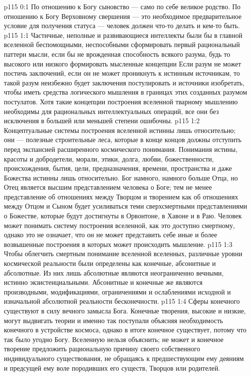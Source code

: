 \author{Могучий Вестник}
\vs p115 0:1 По отношению к Богу сыновство --- само по себе великое родство. По отношению к Богу Верховному свершения --- это необходимое предварительное условие для получения статуса --- человек должен что\hyp{}то делать и кем\hyp{}то быть.
\vs p115 1:1 Частичные, неполные и развивающиеся интеллекты были бы в главной вселенной беспомощными, неспособными сформировать первый рациональный паттерн мысли, если бы не врожденная способность всякого разума, будь то высокого или низкого формировать мысленные концепции  Если разум не может постичь заключений, если он не может проникнуть к истинным источникам, то такой разум неизбежно будет заключения постулировать и источники изобретать, чтобы иметь средства логического мышления в границах этих созданных разумом постулатов. Хотя такие концепции построения вселенной тварному мышлению необходимы для рациональных интеллектуальных операций, все они без исключения в большей или меньшей степени ошибочны.
\vs p115 1:2 Концептуальные системы построения вселенной истинны лишь относительно; они --- полезные строительные леса, которые в конце концов должны отступить перед экспансией расширенного космического понимания. Понимания истины, красоты и добродетели, морали, этики, долга, любви, божественности, происхождения, бытия, цели, предназначения, времени, пространства и даже Божества истинны лишь относительно. Бог намного, намного больше Отца, но Отец является высшим представлением человека о Боге; тем не менее представление об отношениях между Творцом и творением как об отношениях между Отцом и Сыном будет усиливаться теми сверхсмертными представлениями о Божестве, которые будут достигнуты в Орвонтоне, в Хавоне и в Раю. Человек может понимать систему построения вселенной, как это доступно смертному, однако это не означает, что он не может представить себе иные и более возвышенные построения в которых может происходить мышление.
\vs p115 1:3 Чтобы облегчить смертным понимание вселенной вселенных, различные уровни космической реальности были определены как конечные, абсонитные и абсолютные. Из них лишь абсолютные являются неограниченно вечными, истинно экзистенциальными. Абсонитные и конечные же являются производными, модификациями, ограничениями и ослаблениями исходной и изначальной абсолютной реальности бесконечности.
\vs p115 1:4 Сферы конечного существуют в силу вечного замысла Бога. Конечные творения, высокие и низкие, могут выдвигать теории и именно так поступали объясняя необходимость конечного в устройстве космоса, однако в итоге конечное существует, потому что так было угодно Богу. Вселенную нельзя объяснить; не может и конечное творение предложить рациональную причину своего собственного индивидуального существования, не обращаясь к предшествующим ему деяниям и предсущей ему воле породивших его существ, Творцов или родителей.
